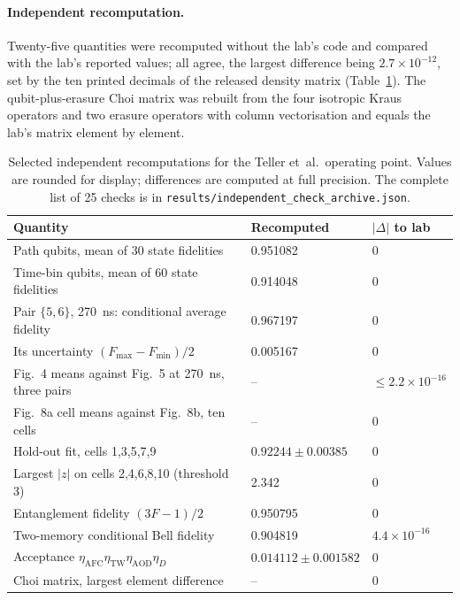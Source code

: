 \paragraph{Independent recomputation.}
Twenty-five quantities were recomputed without the lab's code and compared with the lab's reported values; all agree, the largest difference being $2.7\times10^{-12}$, set by the ten printed decimals of the released density matrix (Table~\ref{tab:external-independent}). The qubit-plus-erasure Choi matrix was rebuilt from the four isotropic Kraus operators and two erasure operators with column vectorisation and equals the lab's matrix element by element.

\begin{table}[tbp]
\centering\small
\begin{tabular}{p{.50\linewidth}p{.20\linewidth}p{.18\linewidth}}
\toprule Quantity & Recomputed & $|\Delta|$ to lab \\
\midrule
Path qubits, mean of 30 state fidelities & 0.951082 & 0 \\
Time-bin qubits, mean of 60 state fidelities & 0.914048 & 0 \\
Pair $\{5,6\}$, 270~ns: conditional average fidelity & 0.967197 & 0 \\
Its uncertainty $(F_{\max}-F_{\min})/2$ & 0.005167 & 0 \\
Fig.~4 means against Fig.~5 at 270~ns, three pairs & -- & $\le 2.2\times10^{-16}$ \\
Fig.~8a cell means against Fig.~8b, ten cells & -- & 0 \\
Hold-out fit, cells 1,3,5,7,9 & $0.92244\pm0.00385$ & 0 \\
Largest $|z|$ on cells 2,4,6,8,10 (threshold 3) & 2.342 & 0 \\
Entanglement fidelity $(3F-1)/2$ & 0.950795 & 0 \\
Two-memory conditional Bell fidelity & 0.904819 & $4.4\times10^{-16}$ \\
Acceptance $\eta_{\mathrm{AFC}}\eta_{\mathrm{TW}}\eta_{\mathrm{AOD}}\eta_{D}$ & $0.014112\pm0.001582$ & 0 \\
Choi matrix, largest element difference & -- & 0 \\
\bottomrule
\end{tabular}
\caption{Selected independent recomputations for the Teller et~al.\ operating point. Values are rounded for display; differences are computed at full precision. The complete list of 25 checks is in \nolinkurl{results/independent_check_archive.json}.}
\label{tab:external-independent}
\end{table}

